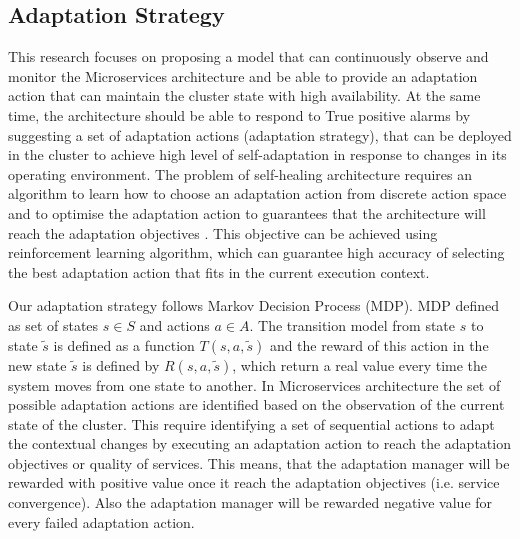 \documentclass{ieeeaccess}
\begin{document}
\subsection{Adaptation Strategy}
\label{sec:mapk}
This research focuses on proposing a model that can continuously observe and monitor the Microservices architecture and be able to provide an adaptation action that can maintain the cluster state  with high availability. At the same time, the architecture should be able to respond to True positive alarms by suggesting a set of adaptation actions (adaptation strategy), that can be deployed in the cluster to achieve high level of self-adaptation in response to changes in its operating environment. The problem of self-healing architecture requires an algorithm to learn how to choose an adaptation action from discrete action space and to optimise the adaptation action to guarantees that the architecture will reach the adaptation objectives \cite{van2012reinforcement}. This objective can be achieved using reinforcement learning algorithm, which can guarantee high accuracy of selecting the best adaptation action that fits in the current execution context. 

Our adaptation strategy follows Markov Decision Process (MDP). MDP defined as set of states $s \in S$ and actions $a \in A$.  The transition model from  state $s$ to state $\tilde{s}$ is defined as a function $T(s,a,\tilde{s})$ and the reward of this action in the new state $\tilde{s}$ is defined by $R(s,a,\tilde{s})$, which return a real value every time the system moves from one state to another. In Microservices architecture the set of possible adaptation actions are identified based on the observation of the current state of the cluster. This require identifying a set of sequential actions to adapt the contextual changes by executing an adaptation action to reach the adaptation objectives or quality of services.  This means, that the adaptation manager will be rewarded with positive value once it reach the adaptation objectives (i.e. service convergence). Also the adaptation manager will be rewarded  negative value for every failed adaptation action. 
\end{document}
